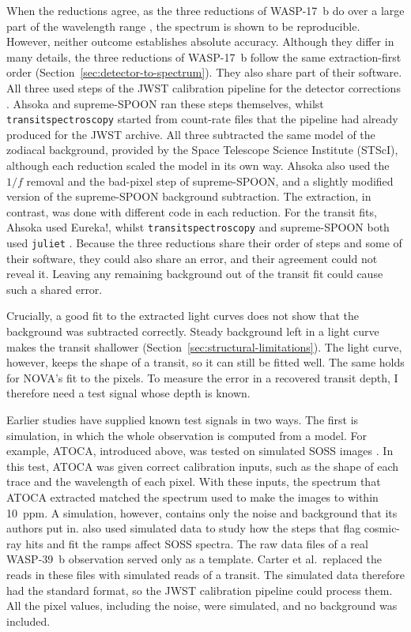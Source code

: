 When the reductions agree, as the three reductions of WASP-17~b do over a
large part of the wavelength range \citep{LouieEtAl2025}, the spectrum is
shown to be reproducible. However, neither outcome establishes absolute
accuracy. Although they differ in many details, the three reductions of WASP-17~b follow the same extraction-first order
(Section~\ref{sec:detector-to-spectrum}). They also
share part of their software. All three used steps of the JWST calibration
pipeline for the detector corrections
\citep{JWSTPipeline2025,RadicaEtAl2023,LouieEtAl2025}. Ahsoka and supreme-SPOON ran these steps themselves, whilst \texttt{transitspectroscopy} started from count-rate files that
the pipeline had already produced for the JWST archive. All three subtracted
the same model of the zodiacal background, provided by the Space Telescope
Science Institute (STScI), although each reduction scaled the model in its own
way. Ahsoka also used the $1/f$ removal and the bad-pixel step of
supreme-SPOON, and a slightly modified version of the supreme-SPOON background
subtraction. The extraction, in contrast, was done with different code in
each reduction. For the transit fits, Ahsoka used Eureka!, whilst
\texttt{transitspectroscopy} and supreme-SPOON both used \texttt{juliet}
\citep{LouieEtAl2025}. Because the three reductions share their order of steps and some of their software, they could also share an error, and their agreement could not reveal it. Leaving any remaining background out of the transit fit could cause such a shared error.

Crucially, a good fit to the extracted light curves does not show that the
background was subtracted correctly. Steady background left in a light curve
makes the transit shallower (Section~\ref{sec:structural-limitations}). The
light curve, however, keeps the shape of a transit, so it can still be
fitted well. The same holds for NOVA's fit to the pixels. To measure the error
in a recovered transit depth, I therefore need a test signal whose depth is
known.

Earlier studies have supplied known test signals in two ways. The first is
simulation, in which the whole observation is computed from a model. For
example, ATOCA, introduced above, was tested on simulated SOSS images
\citep{DarveauBernierEtAl2022}. In this test, ATOCA was given correct
calibration inputs, such as the shape of each trace and the wavelength of each
pixel. With these inputs, the spectrum that ATOCA extracted matched the
spectrum used to make the images to within 10~ppm. A simulation, however,
contains only the noise and background that its authors put in.
\citet{CarterEtAl2025} also used simulated data to study how the steps that
flag cosmic-ray hits and fit the ramps affect SOSS spectra. The raw data files
of a real WASP-39~b observation served only as a template. Carter et al.\
replaced the reads in these files with simulated reads of a transit. The
simulated data therefore had the standard format, so the JWST calibration
pipeline could process them. All the pixel values, including the noise, were
simulated, and no background was included.

